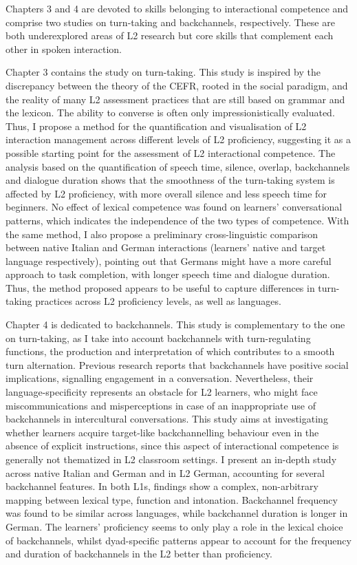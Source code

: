 Chapters 3 and 4 are devoted to skills belonging to interactional competence and comprise two studies on turn-taking and backchannels, respectively. These are both underexplored areas of L2 research but core skills that complement each other in spoken interaction.

Chapter 3 contains the study on turn-taking. This study is inspired by the discrepancy between the theory of the CEFR, rooted in the social paradigm, and the reality of many L2 assessment practices that are still based on grammar and the lexicon. The ability to converse is often only impressionistically evaluated. Thus, I propose a method for the quantification and visualisation of L2 interaction management across different levels of L2 proficiency, suggesting it as a possible starting point for the assessment of L2 interactional competence. The analysis based on the quantification of speech time, silence, overlap, backchannels and dialogue duration shows that the smoothness of the turn-taking system is affected by L2 proficiency, with more overall silence and less speech time for beginners. No effect of lexical competence was found on learners’ conversational patterns, which indicates the independence of the two types of competence. With the same method, I also propose a preliminary cross-linguistic comparison between native Italian and German interactions (learners’ native and target language respectively), pointing out that Germans might have a more careful approach to task completion, with longer speech time and dialogue duration. Thus, the method proposed appears to be useful to capture differences in turn-taking practices across L2 proficiency levels, as well as languages.

Chapter 4 is dedicated to backchannels. This study is complementary to the one on turn-taking, as I take into account backchannels with turn-regulating functions, the production and interpretation of which contributes to a smooth turn alternation. Previous research reports that backchannels have positive social implications, signalling engagement in a conversation. Nevertheless, their language-specificity represents an obstacle for L2 learners, who might face miscommunications and misperceptions in case of an inappropriate use of backchannels in intercultural conversations. This study aims at investigating whether learners acquire target-like backchannelling behaviour even in the absence of explicit instructions, since this aspect of interactional competence is generally not thematized in L2 classroom settings. I present an in-depth study across native Italian and German and in L2 German, accounting for several backchannel features. In both L1s, findings show a complex, non-arbitrary mapping between lexical type, function and intonation. Backchannel frequency was found to be similar across languages, while backchannel duration is longer in German. The learners’ proficiency seems to only play a role in the lexical choice of backchannels, whilst dyad-specific patterns appear to account for the frequency and duration of backchannels in the L2 better than proficiency.

